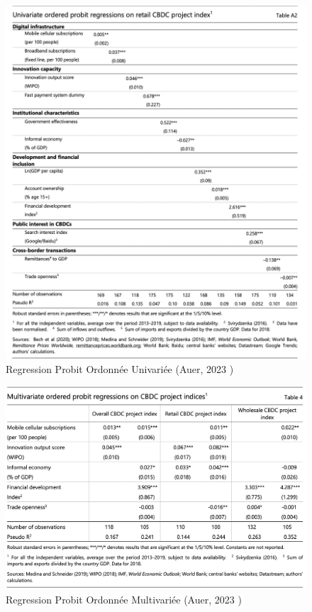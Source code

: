 \documentclass[12pt]{article}
\begin{document}
\begin{figure}
    \centering
    \includegraphics[width=0.8\linewidth]{TAB AUER Univariate .png}
    \caption{Regression Probit Ordonnée Univariée (Auer, 2023 \cite{RePEc:bis:biswps:880})}
    \label{fig:Regression-Probit-Ordonnée-Univariée}
\end{figure}

\begin{figure}
    \centering
    \includegraphics[width=0.8\linewidth]{TAB AUER Ordered.png}
    \caption{Regression Probit Ordonnée Multivariée (Auer, 2023 \cite{RePEc:bis:biswps:880})}
    \label{fig:Regression_Probit_Ordonnée_Multivariée}
\end{figure}

\clearpage
\end{document}
